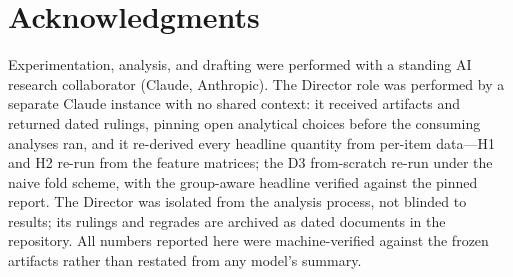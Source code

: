 \documentclass[10pt]{article}
\begin{document}
\section*{Acknowledgments}
Experimentation, analysis, and drafting were performed with a standing AI
research collaborator (Claude, Anthropic). The Director role was performed
by a separate Claude instance with no shared context: it received
artifacts and returned dated rulings, pinning open analytical choices
before the consuming analyses ran, and it re-derived every headline
quantity from per-item data---H1 and H2 re-run from the feature matrices;
the D3 from-scratch re-run under the naive fold scheme, with the
group-aware headline verified against the pinned report. The Director was
isolated from the analysis process, not blinded to results; its rulings
and regrades are archived as dated documents in the repository. All
numbers reported here were machine-verified against the frozen artifacts
rather than restated from any model's summary.
\end{document}
